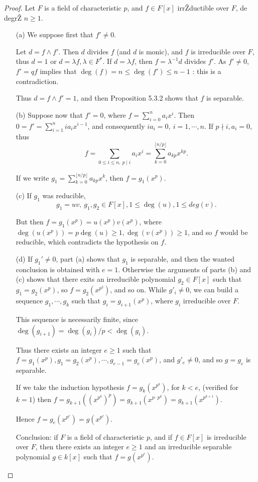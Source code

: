 \documentclass[11pt,a4paper]{article}
\begin{document}
\begin{proof}
Let $F$ is a field of characteristic $p$, and $f \in F[x]$ irrŽductible over $F$, de degrŽ $n\geq 1$.
\begin{enumerate}
\item[(a)]
We suppose first that $f'\neq 0$.

Let $d = f\wedge f'$. Then $d$ divides  $f$ (and $d$ is monic), and $f$ is irreducible over $F$, thus $d=1$ or $d = \lambda f,\lambda \in F^*$.
If $d = \lambda f$, then $f =\lambda^{-1} d$ divides $f'$. As $f' \neq 0$, $f' = qf$ implies that $\deg(f) = n \leq \deg(f') \leq n-1$ : this is a contradiction.

Thus $d= f\wedge f' = 1$, and then Proposition 5.3.2 shows that $f$ is separable.

\item[(b)]
Suppose now that $f'=0$, where $f = \sum\limits_{i=0}^n a_i x^i$.
Then $0 = f' = \sum\limits_{i=1}^{n} ia_{i} x^{i-1}$, and consequently $ia_i = 0, \ i=1,\cdots,n$. If $p\nmid i, a_i = 0$, thus 
$$f = \sum\limits_{0\leq i \leq n,\ p\mid i} a_i x^i = \sum\limits_{k=0}^{\lfloor n/p \rfloor} a_{kp} x^{kp}.$$

If we write $g_1 = \sum\limits_{k=0}^{\lfloor n/p \rfloor} a_{kp} x^{k}$, then $f = g_1(x^p)$.

\item[(c)]
If $g_1$ was reducible, $$g_1 = u v,\ g_1,g_2 \in F[x], 1\leq \deg(u), 1\leq deg(v) .$$

But then $f = g_1(x^p) = u(x^p)v(x^p)$, where $\deg(u(x^p)) = p \deg(u) \geq 1, \deg(v(x^p)) \geq 1$, and so  $f$ would be reducible, which contradicts the hypothesis on $f$.

\item[(d)]
If $g_1'\neq 0$, part (a) shows that $g_1$ is separable, and then the wanted conclusion is obtained with $e=1$.
Otherwise the arguments of parts (b) and (c) shows that there exits an irreducible polynomial $g_2 \in F[x]$ such that $g_1 = g_2(x^p)$, so $f = g_2(x^{p^2})$, and so on. While $g'_i \neq 0$, we can build a sequence $g_1,\cdots,g_k$ such that $g_i = g_{i+1}(x^p)$, where $g_i$ irreducible over $F$.

This sequence is necessarily finite, since $\deg(g_{i+1}) = \deg(g_i)/p < \deg(g_i)$. 

Thus there exists an integer $e \geq 1$ such that $f = g_1(x^p), g_1 = g_2(x^p), \cdots, g_{e-1} = g_{e}(x^p)$, and $g'_{e} \ne 0$, and so $g = g_e$ is separable.

If we take the induction hypothesis $f = g_k(x^{p^k})$, for $k<e$, (verified for $k=1$) then $f = g_{k+1}((x^{p^k})^p) =  g_{k+1}(x^{p \cdot p^k}) = g_{k+1}(x^{p^{k+1}})$.

Hence $f = g_{e}(x^{p^{e}}) = g(x^{p^e})$.

Conclusion:  if $F$ is a field of characteristic $p$, and if $f \in F[x]$ is irreducible over $F$, then there exists an integer $e\geq 1$ and an irreducible separable polynomial $g \in k[x]$ such that $f = g(x^{p^e})$.
\end{enumerate}
\end{proof}
\end{document}
